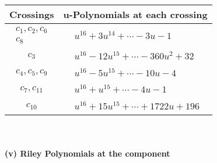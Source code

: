 \documentclass[1p]{elsarticle_modified}
\theoremstyle{definition}
\begin{document}
\begin{tabular}{m{50pt}|m{274pt}}
Crossings & \hspace{64pt}u-Polynomials at each crossing \\
\hline $$\begin{aligned}c_{1},c_{2},c_{6}\\c_{8}\end{aligned}$$&$\begin{aligned}
&u^{16}+3 u^{14}+\cdots-3 u-1
\end{aligned}$\\
\hline $$\begin{aligned}c_{3}\end{aligned}$$&$\begin{aligned}
&u^{16}-12 u^{15}+\cdots-360 u^2+32
\end{aligned}$\\
\hline $$\begin{aligned}c_{4},c_{5},c_{9}\end{aligned}$$&$\begin{aligned}
&u^{16}-5 u^{15}+\cdots-10 u-4
\end{aligned}$\\
\hline $$\begin{aligned}c_{7},c_{11}\end{aligned}$$&$\begin{aligned}
&u^{16}+u^{15}+\cdots-4 u-1
\end{aligned}$\\
\hline $$\begin{aligned}c_{10}\end{aligned}$$&$\begin{aligned}
&u^{16}+15 u^{15}+\cdots+1722 u+196
\end{aligned}$\\
\hline
\end{tabular}\\~\\
\newpage\renewcommand{\arraystretch}{1}
\flushleft \textbf{(v) Riley Polynomials at the component}\newline \\
\end{document}
